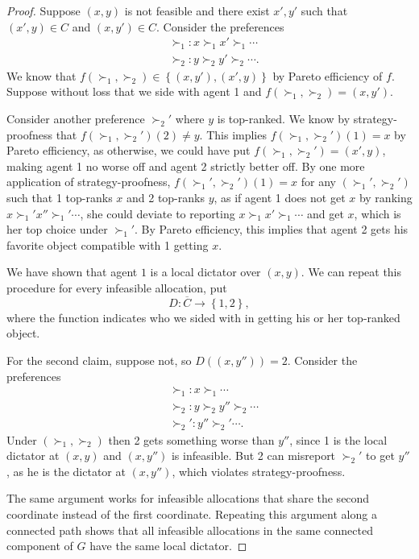 \begin{proof}	
	Suppose $(x,y)$ is not feasible and there exist $x',y'$ such that $(x',y) \in C$ and $(x,y') \in C$. Consider the preferences
	\begin{align*}
		&\succ_1 : x \succ_1 x' \succ_1 \cdots \\
		&\succ_2: y \succ_2 y' \succ_2 \cdots
	.\end{align*}
	We know that $f(\succ_1,\succ_2) \in \left\{\left( x,y' \right), \left( x',y \right)\right\}$ by Pareto efficiency of $f$.
	Suppose without loss that we side with agent 1 and $f(\succ_1,\succ_2) = (x,y')$.

	Consider another preference $\succ_2'$ where $y$ is top-ranked. We know by strategy-proofness that $f(\succ_1,\succ_2')(2) \ne y$. This implies $f(\succ_1,\succ_2')(1) = x$ by Pareto efficiency, as otherwise, we could have put $f(\succ_1,\succ_2') = (x',y)$, making agent 1 no worse off and agent 2 strictly better off.
	By one more application of strategy-proofness, $f(\succ_1',\succ_2')(1) = x$ for any $\left( \succ_1',\succ_2' \right)$ such that 1 top-ranks $x$ and 2 top-ranks $y$, as if agent 1 does not get $x$ by ranking $x \succ_1' x'' \succ_1' \cdots$, she could deviate to reporting $x \succ_1 x' \succ_1 \cdots$ and get $x$, which is her top choice under $\succ_1'$. By Pareto efficiency, this implies that agent 2 gets his favorite object compatible with 1 getting $x$.

	We have shown that agent $1$ is a local dictator over $(x,y)$.
	We can repeat this procedure for every infeasible allocation,
	put \[
		D: \overline{C} \to \left\{1,2\right\}
	,\] 
	where the function indicates who we sided with in getting his or her top-ranked object.

	\medskip

	For the second claim, suppose not, so $D\left( \left( x,y'' \right) \right) = 2$. Consider the preferences 
	\begin{align*}
		&\succ_1: x \succ_1 \cdots \\
		&\succ_2: y \succ_2 y'' \succ_2 \cdots \\
		&\succ_2': y'' \succ_2' \cdots
	.\end{align*}
	Under $(\succ_1,\succ_2)$ then 2 gets something worse than $y''$, since 1 is the local dictator at $(x,y)$ and $(x,y'')$ is infeasible. But 2 can misreport $\succ_2'$ to get $y''$, as he is the dictator at $(x,y'')$, which violates strategy-proofness.

	The same argument works for infeasible allocations that share the second coordinate instead of the first coordinate. Repeating this argument along a connected path shows that all infeasible allocations in the same connected component of $G$ have the same local dictator.
\end{proof}

